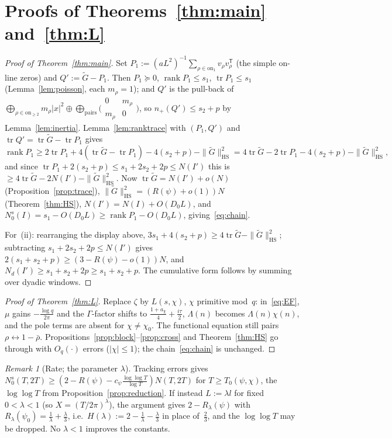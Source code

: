 \documentclass[11pt]{amsart}
\theoremstyle{definition}
\theoremstyle{remark}
\newtheorem{remark}[theorem]{Remark}
\numberwithin{equation}{section}
\DeclareMathOperator{\tr}{tr}
\DeclareMathOperator{\rank}{rank}
\newcommand{\Gt}{\widetilde{G}}
\newcommand{\npl}{n_{+}}
\newcommand{\HS}{\mathrm{HS}}
\begin{document}
\section{Proofs of Theorems~\ref{thm:main} and~\ref{thm:L}}\label{sec:proofs}

\begin{proof}[Proof of Theorem~\ref{thm:main}]
Set $P_1:=(aL^2)^{-1}\sum_{\rho\in\mathrm{on}_1}v_\rho v_\rho^{\mathsf T}$ (the simple on-line zeros) and $Q':=\Gt-P_1$. Then $P_1\succeq0$, $\rank P_1\le s_1$, $\tr P_1\le s_1$ (Lemma~\ref{lem:poisson}, each $m_\rho=1$); and $Q'$ is the pull-back of $\bigoplus_{\rho\in\mathrm{on}_{\ge2}}m_\rho|x|^2\oplus\bigoplus_{\text{pairs}}\bigl(\begin{smallmatrix}0&m_\rho\\m_\rho&0\end{smallmatrix}\bigr)$, so $\npl(Q')\le s_2+p$ by Lemma~\ref{lem:inertia}. Lemma~\ref{lem:ranktrace} with $(P_1,Q')$ and $\tr Q'=\tr\Gt-\tr P_1$ gives
\[
\rank P_1\ge2\tr P_1+4(\tr\Gt-\tr P_1)-4(s_2+p)-\|\Gt\|_{\HS}^2=4\tr\Gt-2\tr P_1-4(s_2+p)-\|\Gt\|_{\HS}^2,
\]
and since $\tr P_1+2(s_2+p)\le s_1+2s_2+2p\le N(I')$ this is $\ge4\tr\Gt-2N(I')-\|\Gt\|_{\HS}^2$. Now $\tr\Gt=N(I')+o(N)$ (Proposition~\ref{prop:trace}), $\|\Gt\|_{\HS}^2=(R(\psi)+o(1))N$ (Theorem~\ref{thm:HS}), $N(I')=N(I)+O(D_0L)$, and $N_0^{s}(I)=s_1-O(D_0L)\ge\rank P_1-O(D_0L)$, giving~\eqref{eq:chain}.

For~(ii): rearranging the display above, $3s_1+4(s_2+p)\ge4\tr\Gt-\|\Gt\|_{\HS}^2$; subtracting $s_1+2s_2+2p\le N(I')$ gives $2(s_1+s_2+p)\ge(3-R(\psi)-o(1))N$, and $N_d(I')\ge s_1+s_2+2p\ge s_1+s_2+p$. The cumulative form follows by summing over dyadic windows.
\end{proof}

\begin{proof}[Proof of Theorem~\ref{thm:L}]
Replace $\zeta$ by $L(s,\chi)$, $\chi$ primitive mod~$q$: in~\eqref{eq:EF}, $\mu$ gains $-\tfrac{\log q}{2\pi}$ and the $\Gamma$-factor shifts to $\tfrac{1+a_\chi}4+\tfrac{i\tau}2$, $\Lambda(n)$ becomes $\Lambda(n)\chi(n)$, and the pole terms are absent for $\chi\ne\chi_0$. The functional equation still pairs $\rho\leftrightarrow1-\bar\rho$. Propositions~\ref{prop:block}--\ref{prop:cross} and Theorem~\ref{thm:HS} go through with $O_q(\cdot)$ errors ($|\chi|\le1$); the chain~\eqref{eq:chain} is unchanged.
\end{proof}

\begin{remark}[Rate; the parameter $\lambda$]\label{rem:rate}
Tracking errors gives $N_0^{s}(T,2T)\ge(2-R(\psi)-c_\psi\tfrac{\log\log T}{\log T})N(T,2T)$ for $T\ge T_0(\psi,\chi)$, the $\log\log T$ from Proposition~\ref{prop:reduction}. If instead $L:=\lambda l$ for fixed $0<\lambda<1$ (so $X=(T/2\pi)^\lambda$), the argument gives $2-R_\lambda(\psi)$ with $R_\lambda(\psi_0)=\tfrac1\lambda+\tfrac\lambda3$, i.e.\ $H(\lambda):=2-\tfrac1\lambda-\tfrac\lambda3$ in place of~$\tfrac23$, and the $\log\log T$ may be dropped. No $\lambda<1$ improves the constants.
\end{remark}
\end{document}
